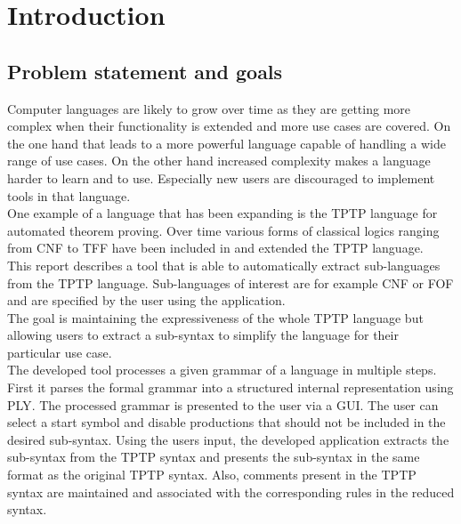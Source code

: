 
\chapter{Introduction}\label{cha:Introduction}

\section{Problem statement and goals}\label{sec:Aufgabenstellung}
Computer languages are likely to grow over time as they are getting more complex when their functionality is extended and more use cases are covered.
On the one hand that leads to a more powerful language capable of handling a wide range of use cases.
On the other hand increased complexity makes a language harder to learn and to use. Especially new users are discouraged to implement tools in that language.\\
One example of a language that has been expanding is the \ac{TPTP} language for automated theorem proving. Over time
various forms of classical logics ranging from \ac{CNF} to \ac{TFF} have been included in and extended the \ac{TPTP} language. \\
This report describes a tool that is able to automatically extract sub-languages from the \ac{TPTP} language. Sub-languages of interest are for example \ac{CNF} or \ac{FOF} and are specified by the user using the application.\\
The goal is maintaining the expressiveness of the whole \ac{TPTP} language but allowing users to extract a sub-syntax to simplify the language for their particular use case. \\
The developed tool processes a given grammar of a language in multiple steps.
First it parses the formal grammar into a structured internal representation using \ac{PLY}.
The processed grammar is presented to the user via a GUI. The user can select a start symbol and disable productions that should not be included in the desired sub-syntax.
Using the users input, the developed application extracts the sub-syntax from the \ac{TPTP} syntax and presents the sub-syntax in the same format as the original \ac{TPTP} syntax.
Also, comments present in the \ac{TPTP} syntax are maintained and associated with the corresponding rules in the reduced syntax.

